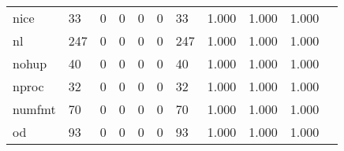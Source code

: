 \begin{longtable}{lp{1.20cm}p{1.20cm}p{1.20cm}p{1.20cm}p{1.20cm}p{1.20cm}p{1.20cm}p{1.20cm}p{1.20cm}p{1.20cm}}
nice      &                                    33 &                                                  0 &                                                  0 &                                                  0 &                                                  0 &                                                 33 &                                         1.000 &                                              1.000 &                                              1.000 \\
nl        &                                   247 &                                                  0 &                                                  0 &                                                  0 &                                                  0 &                                                247 &                                         1.000 &                                              1.000 &                                              1.000 \\
nohup     &                                    40 &                                                  0 &                                                  0 &                                                  0 &                                                  0 &                                                 40 &                                         1.000 &                                              1.000 &                                              1.000 \\
nproc     &                                    32 &                                                  0 &                                                  0 &                                                  0 &                                                  0 &                                                 32 &                                         1.000 &                                              1.000 &                                              1.000 \\
numfmt    &                                    70 &                                                  0 &                                                  0 &                                                  0 &                                                  0 &                                                 70 &                                         1.000 &                                              1.000 &                                              1.000 \\
od        &                                    93 &                                                  0 &                                                  0 &                                                  0 &                                                  0 &                                                 93 &                                         1.000 &                                              1.000 &                                              1.000 \\

\end{longtable}
